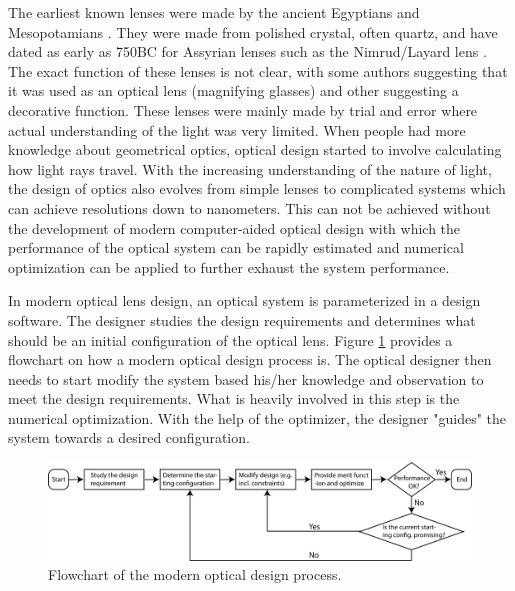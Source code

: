 The earliest known lenses were made by the ancient Egyptians and Mesopotamians \cite{wiki:HistoryofOptics}. They were made from polished crystal, often quartz, and have dated as early as 750BC for Assyrian lenses such as the Nimrud/Layard lens \cite{wiki:Nimrudlens}. The exact function of these lenses is not clear, with some authors suggesting that it was used as an optical lens (magnifying glasses) and other suggesting a decorative function. These lenses were mainly made by trial and error where actual understanding of the light was very limited. When people had more knowledge about geometrical optics, optical design started to involve calculating how light rays travel. With the increasing understanding of the nature of light, the design of optics also evolves from simple lenses to complicated systems which can achieve resolutions down to nanometers. This can not be achieved without the development of modern computer-aided optical design with which the performance of the optical system can be rapidly estimated and numerical optimization can be applied to further exhaust the system performance.

In modern optical lens design, an optical system is parameterized in a design software. The designer studies the design requirements and determines what should be an initial configuration of the optical lens. Figure \ref{fig:chap0 model design flow} provides a flowchart on how a modern optical design process is. The optical designer then needs to start modify the system based his/her knowledge and observation to meet the design requirements. What is heavily involved in this step is the numerical optimization. With the help of the optimizer, the designer "guides" the system towards a desired configuration. 

\begin{figure}
    \centering
    \includegraphics[scale=0.58]{chapter-0/figures/lens_design_flow_chart.png}
    \caption{Flowchart of the modern optical design process.}
    \label{fig:chap0 model design flow}
\end{figure} 

